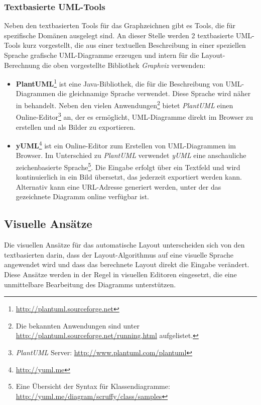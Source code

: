 \subsubsection{Textbasierte UML-Tools}

Neben den textbasierten Tools für das Graphzeichnen gibt es Tools, die für spezifische Domänen ausgelegt sind. An dieser Stelle werden 2 textbasierte UML-Tools kurz vorgestellt, die aus einer textuellen Beschreibung in einer speziellen Sprache grafische UML-Diagramme erzeugen und intern für die Layout-Berechnung die oben vorgestellte Bibliothek \textit{Graphviz} verwenden:

\begin{itemize}
    \item \textbf{PlantUML}\footnote{\url{http://plantuml.sourceforge.net}} ist eine Java-Bibliothek, die für die Beschreibung von UML-\-Dia\-grammen die gleichnamige Sprache verwendet. Diese Sprache wird näher in \cite{Roques10Drawing} behandelt. Neben den vielen Anwendungen\footnote{Die bekannten Anwendungen sind unter \url{http://plantuml.sourceforge.net/running.html} aufgelistet.} bietet \textit{PlantUML} einen Online-Editor\footnote{\textit{PlantUML} Server: \url{http://www.plantuml.com/plantuml}} an, der es ermöglicht, UML-Diagramme direkt im Browser zu erstellen und als Bilder zu exportieren.
    \item \textbf{yUML}\footnote{\url{http://yuml.me}} ist ein Online-Editor zum Erstellen von UML-Diagrammen im Browser. Im Unterschied zu \textit{PlantUML} verwendet \textit{yUML} eine anschauliche zeichenbasierte Sprache\footnote{Eine Übersicht der Syntax für Klassendiagramme: \url{http://yuml.me/diagram/scruffy/class/samples}}. Die Eingabe erfolgt über ein Textfeld und wird kontinuierlich in ein Bild übersetzt, das jederzeit exportiert werden kann. Alternativ kann eine URL-Adresse generiert \cite{Fuhrmann11On-the-Pragmatics} werden, unter der das gezeichnete Diagramm online verfügbar ist.
\end{itemize}

\subsection{Visuelle Ansätze}
\label{subsec:visual-approaches}

Die visuellen Ansätze für das automatische Layout unterscheiden sich von den textbasierten darin, dass der Layout-Algorithmus auf eine visuelle Sprache angewendet wird und dass das berechnete Layout direkt die Eingabe verändert. Diese Ansätze werden in der Regel in visuellen Editoren eingesetzt, die eine unmittelbare Bearbeitung des Diagramms unterstützen.

